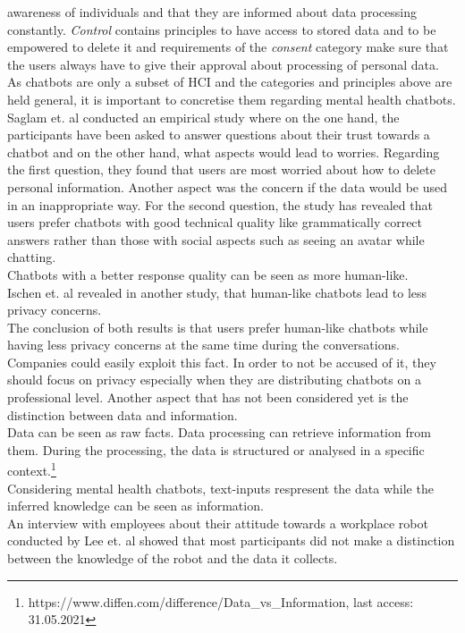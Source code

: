 \documentclass[sigconf, nonacm]{acmart}
\begin{document}
awareness of individuals and that they are informed about data processing constantly. \emph{Control} contains principles to have access to stored data and to be empowered to delete it and requirements of the \emph{consent} category make sure that the users always have to give their approval about processing of personal data.
\\
As chatbots are only a subset of HCI and the categories and principles above are held general, it is important to concretise them regarding mental health chatbots.
\\
Saglam et. al \cite{Saglam2021} conducted an empirical study where on the one hand, the participants have been asked to answer questions about their trust towards a chatbot and 
on the other hand, what aspects would lead to worries. Regarding the first question, they found that users are most worried about how to delete personal information. Another aspect was the concern if the data would be used in an inappropriate way. 
For the second question, the study has revealed that users prefer chatbots with good technical quality like grammatically correct answers rather than those with social aspects such as seeing an avatar while chatting.
\\
Chatbots with a better response quality can be seen as more human-like.
\\
Ischen et. al \cite{Ischen} revealed in another study, that human-like chatbots lead to less privacy concerns.
\\
The conclusion of both results is that users prefer human-like chatbots while having less privacy concerns at the same time during the conversations. Companies could easily exploit this fact. In order to not be accused of it, they should focus on privacy especially when they are distributing chatbots on a professional level.  
Another aspect that has not been considered yet is the distinction between data and information.
\\
Data can be seen as raw facts. Data processing can retrieve information from them. During the processing, the data is structured or analysed in a specific context.\footnote{https://www.diffen.com/difference/Data\_vs\_Information, last access: 31.05.2021}
\\ 
Considering mental health chatbots, text-inputs respresent the data while
the inferred knowledge can be seen as information.
\\
An interview with employees about their attitude towards a workplace robot conducted by Lee et. al \cite{Lee2011} showed that most participants did not make a distinction between the knowledge of the robot and the data it collects.
\end{document}
